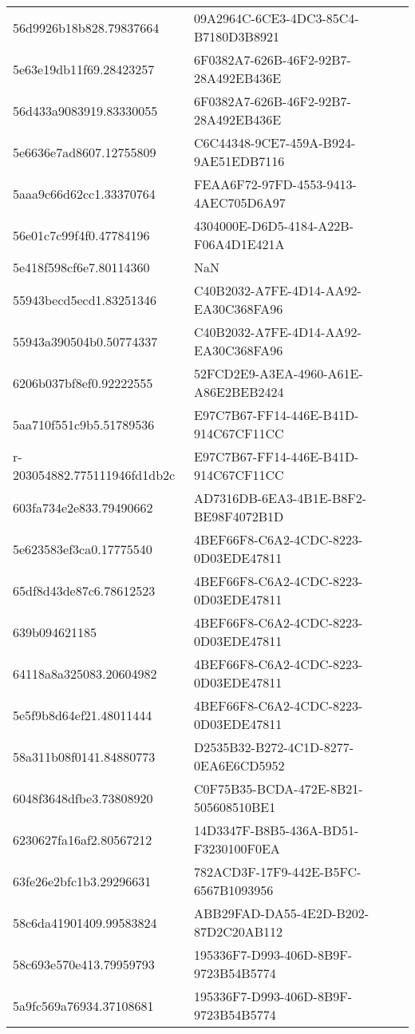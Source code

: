 \begin{tabular}{ll}
56d9926b18b828.79837664 & 09A2964C-6CE3-4DC3-85C4-B7180D3B8921 \\
5e63e19db11f69.28423257 & 6F0382A7-626B-46F2-92B7-28A492EB436E \\
56d433a9083919.83330055 & 6F0382A7-626B-46F2-92B7-28A492EB436E \\
5e6636e7ad8607.12755809 & C6C44348-9CE7-459A-B924-9AE51EDB7116 \\
5aaa9c66d62cc1.33370764 & FEAA6F72-97FD-4553-9413-4AEC705D6A97 \\
56e01c7c99f4f0.47784196 & 4304000E-D6D5-4184-A22B-F06A4D1E421A \\
5e418f598cf6e7.80114360 & NaN \\
55943becd5ecd1.83251346 & C40B2032-A7FE-4D14-AA92-EA30C368FA96 \\
55943a390504b0.50774337 & C40B2032-A7FE-4D14-AA92-EA30C368FA96 \\
6206b037bf8ef0.92222555 & 52FCD2E9-A3EA-4960-A61E-A86E2BEB2424 \\
5aa710f551c9b5.51789536 & E97C7B67-FF14-446E-B41D-914C67CF11CC \\
r-203054882.775111946fd1db2c & E97C7B67-FF14-446E-B41D-914C67CF11CC \\
603fa734e2e833.79490662 & AD7316DB-6EA3-4B1E-B8F2-BE98F4072B1D \\
5e623583ef3ca0.17775540 & 4BEF66F8-C6A2-4CDC-8223-0D03EDE47811 \\
65df8d43de87c6.78612523 & 4BEF66F8-C6A2-4CDC-8223-0D03EDE47811 \\
639b094621185 & 4BEF66F8-C6A2-4CDC-8223-0D03EDE47811 \\
64118a8a325083.20604982 & 4BEF66F8-C6A2-4CDC-8223-0D03EDE47811 \\
5e5f9b8d64ef21.48011444 & 4BEF66F8-C6A2-4CDC-8223-0D03EDE47811 \\
58a311b08f0141.84880773 & D2535B32-B272-4C1D-8277-0EA6E6CD5952 \\
6048f3648dfbe3.73808920 & C0F75B35-BCDA-472E-8B21-505608510BE1 \\
6230627fa16af2.80567212 & 14D3347F-B8B5-436A-BD51-F3230100F0EA \\
63fe26e2bfc1b3.29296631 & 782ACD3F-17F9-442E-B5FC-6567B1093956 \\
58c6da41901409.99583824 & ABB29FAD-DA55-4E2D-B202-87D2C20AB112 \\
58c693e570e413.79959793 & 195336F7-D993-406D-8B9F-9723B54B5774 \\
5a9fc569a76934.37108681 & 195336F7-D993-406D-8B9F-9723B54B5774 \\

\end{tabular}
